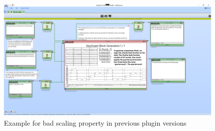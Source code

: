 \begin{figure}
\caption{Example for bad scaling property in previous plugin versions}
\label{fig:plugin.scaling.bug}
\centering
\includegraphics[width=\textwidth]{figures/ct2/scaling-bug-example.png}
\end{figure}

